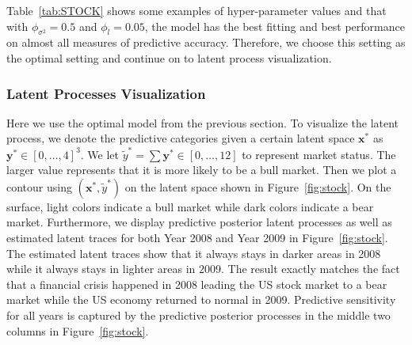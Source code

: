 \documentclass{article}
\begin{document}
Table~\ref{tab:STOCK} shows some examples of hyper-parameter values and that with $\phi_{\sigma^2} = 0.5$ and $\phi_l = 0.05$, the model has the best fitting and best performance on almost all measures of predictive accuracy. Therefore, we choose this setting as the optimal setting and continue on to latent process visualization.




\subsubsection{Latent Processes Visualization}
Here we use the optimal model from the previous section. To visualize the latent process, we denote the predictive categories given a certain latent space $\bm x^*$ as $\bm y^* \in [0,\ldots,4]^3$. We let $\tilde{y}^* = \sum \bm y^* \in [0, \ldots, 12]$ to represent market status. The larger value represents that it is more likely to be a bull market. Then we plot a contour using $(\bm x^*, \tilde{y}^*)$ on the latent space shown in Figure~\ref{fig:stock}. On the surface, light colors indicate a bull market while dark colors indicate a bear market. Furthermore, we display predictive posterior latent processes as well as estimated latent traces for both Year 2008 and Year 2009 in Figure~\ref{fig:stock}. The estimated latent traces show that it always stays in darker areas in 2008 while it always stays in lighter areas in 2009. The result exactly matches the fact that a financial crisis happened in 2008 leading the US stock market to a bear market while the US economy returned to normal in 2009. Predictive sensitivity for all years is captured by the predictive posterior processes in the middle two columns in Figure~\ref{fig:stock}.
\end{document}
